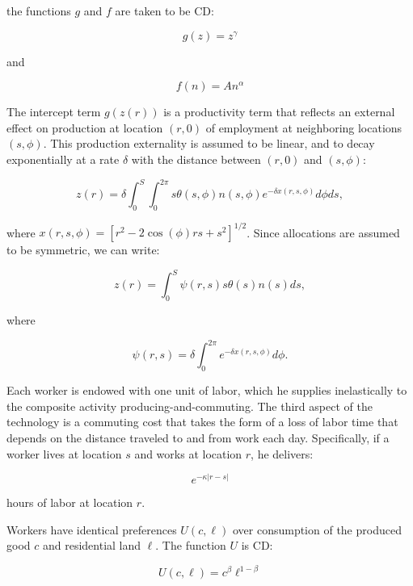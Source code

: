 the functions $g$ and $f$ are taken to be CD:

\begin{equation}
    g(z) = z^{\gamma}
\end{equation}

and

\begin{equation}
    f(n) = An^{\alpha}
\end{equation}

The intercept term $g(z(r))$ is a productivity term that reflects an external effect on production at location $(r, 0)$ of employment at neighboring locations $(s, \phi)$. This production externality is assumed to be linear, and to decay exponentially at a rate $\delta$ with the distance between $(r, 0)$ and $(s, \phi)$:

\begin{equation*}
    z(r) = \delta \int_0^S \int_0^{2\pi} s\theta(s, \phi)n(s, \phi) e^{-\delta x(r, s, \phi)} d\phi ds,
\end{equation*}

where $x(r, s, \phi) = [r^2 - 2\cos(\phi)rs + s^2]^{1/2}$. Since allocations are assumed to be symmetric, we can write:

\begin{equation}
    z(r) = \int_0^S \psi(r, s)s \theta(s)n(s)ds,
\end{equation}

where

\begin{equation}
    \psi(r, s) = \delta \int_0^{2\pi} e^{-\delta x(r, s, \phi)}d\phi.
\end{equation}

Each worker is endowed with one unit of labor, which he supplies inelastically to the composite activity producing-and-commuting. The third aspect of the technology is a commuting cost that takes the form of a loss of labor time that depends on the distance traveled to and from work each day. Specifically, if a worker lives at location $s$ and works at location $r$, he delivers:

\begin{equation*}
    e^{-\kappa |r - s|}
\end{equation*}

hours of labor at location $r$.

Workers have identical preferences $U(c, \ell)$ over consumption of the produced good $c$ and residential land $\ell$. The function $U$ is CD:

\begin{equation}
    U(c, \ell) = c^{\beta}\ell^{1 - \beta}
\end{equation}


